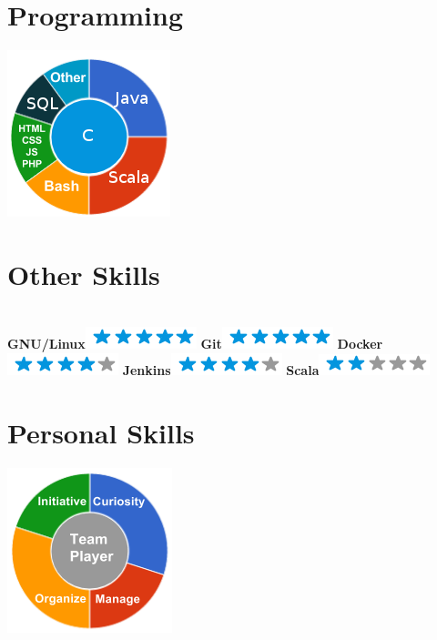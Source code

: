 \documentclass[]{friggeri-cv}
\begin{document}
\begin{aside}
  \section{Programming}
    \includegraphics[scale=0.55]{img/programming.png}
    ~
  \section{Other Skills}
    \textbf{\\GNU/Linux}\includegraphics[scale=0.40]{img/5stars.png}
    \textbf{Git}\includegraphics[scale=0.40]{img/5stars.png}
    \textbf{Docker}\includegraphics[scale=0.40]{img/4stars.png}
    \textbf{Jenkins}\includegraphics[scale=0.40]{img/4stars.png}
    \textbf{Scala}\includegraphics[scale=0.40]{img/2stars.png}
    ~
  \section{Personal Skills}
  \hspace*{-1.3in}
  \includegraphics[scale=0.55]{img/personal.png}
    ~
\end{aside}
\end{document}
